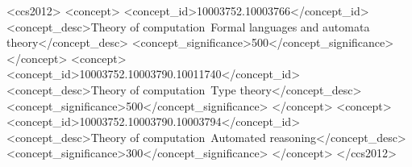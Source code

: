 \documentclass[acmsmall,screen,review,anonymous,nonacm]{acmart}
\begin{document}
\begin{CCSXML}
<ccs2012>
<concept>
<concept_id>10003752.10003766</concept_id>
<concept_desc>Theory of computation~Formal languages and automata theory</concept_desc>
<concept_significance>500</concept_significance>
</concept>
<concept>
<concept_id>10003752.10003790.10011740</concept_id>
<concept_desc>Theory of computation~Type theory</concept_desc>
<concept_significance>500</concept_significance>
</concept>
<concept>
<concept_id>10003752.10003790.10003794</concept_id>
<concept_desc>Theory of computation~Automated reasoning</concept_desc>
<concept_significance>300</concept_significance>
</concept>
</ccs2012>
\end{CCSXML}


\maketitle
















\label{page:main-end}




\appendix
{}
\clearpage
\label{page:appendix-start}








\end{document}
